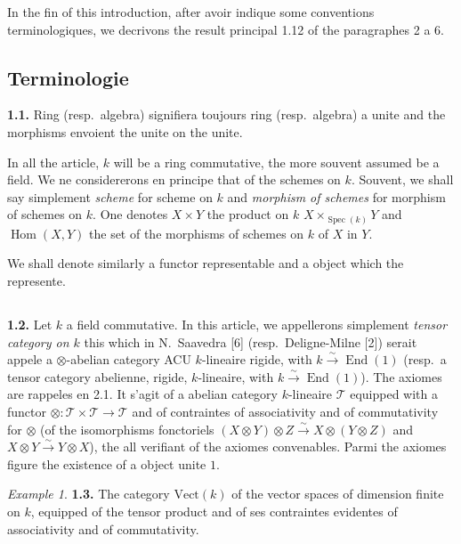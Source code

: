 \documentclass[12pt,a4paper]{article}
\theoremstyle{plain}
\theoremstyle{definition}
\theoremstyle{remark}
\newtheorem{example}[theorem]{Example}
\DeclareMathOperator{\Hom}{Hom}
\DeclareMathOperator{\End}{End}
\DeclareMathOperator{\Spec}{Spec}
\begin{document}
In the fin of this introduction, after avoir indique some conventions terminologiques, we decrivons the result principal 1.12 of the paragraphes 2 a 6.

\subsection{Terminologie}

\textbf{1.1.} Ring (resp.~algebra) signifiera toujours ring (resp.~algebra) a unite and the morphisms envoient the unite on the unite.

In all the article, $k$ will be a ring commutative, the more souvent assumed be a field. We ne considererons en principe that of the schemes on $k$. Souvent, we shall say simplement \emph{scheme} for scheme on $k$ and \emph{morphism of schemes} for morphism of schemes on $k$. One denotes $X \times Y$ the product on $k$ $X \times_{\Spec(k)} Y$ and $\Hom(X,Y)$ the set of the morphisms of schemes on $k$ of $X$ in $Y$.

We shall denote similarly a functor representable and a object which the represente.

\subsection{}

\textbf{1.2.} Let $k$ a field commutative. In this article, we appellerons simplement \emph{tensor category on $k$} this which in N.~Saavedra [6] (resp.~Deligne-Milne [2]) serait appele a $\otimes$-abelian category ACU $k$-lineaire rigide, with $k \xrightarrow{\sim} \End(1)$ (resp.~a tensor category abelienne, rigide, $k$-lineaire, with $k \xrightarrow{\sim} \End(1)$). The axiomes are rappeles en 2.1. It s'agit of a abelian category $k$-lineaire $\mathcal{T}$ equipped with a functor $\otimes : \mathcal{T} \times \mathcal{T} \to \mathcal{T}$ and of contraintes of associativity and of commutativity for $\otimes$ (of the isomorphisms fonctoriels $(X \otimes Y) \otimes Z \xrightarrow{\sim} X \otimes (Y \otimes Z)$ and $X \otimes Y \xrightarrow{\sim} Y \otimes X$), the all verifiant of the axiomes convenables. Parmi the axiomes figure the existence of a object unite $1$.

\begin{example}
\textbf{1.3.} The category $\mathrm{Vect}(k)$ of the vector spaces of dimension finite on $k$, equipped of the tensor product and of ses contraintes evidentes of associativity and of commutativity.
\end{example}
\end{document}
